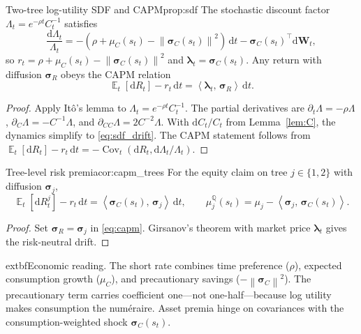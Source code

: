 ﻿\documentclass[11pt,letterpaper,oneside]{article}
\numberwithin{equation}{section}
\DeclareMathOperator{\E}{\mathbb{E}}
\DeclareMathOperator{\Cov}{\mathrm{Cov}}
\newcommand{\1}{\mathbf{1}}
\newcommand{\diff}{\mathrm{d}}
\newcommand{\norm}[1]{\left\lVert #1\right\rVert}
\newcommand{\ip}[2]{\left\langle #1,\,#2\right\rangle}
\begin{document}
\begin{proposition}{Two-tree log-utility SDF and CAPM}{prop:sdf}
The stochastic discount factor $\Lambda_t=e^{-\rho t}C_t^{-1}$ satisfies
\begin{equation}\label{eq:sdf_drift}
  \frac{\diff \Lambda_t}{\Lambda_t}=-(\rho+\mu_C(s_t)-\norm{\bm{\sigma}_C(s_t)}^2)\,\diff t-\bm{\sigma}_C(s_t)^{\top}\diff \bm{W}_t,
\end{equation}
so $r_t=\rho+\mu_C(s_t)-\norm{\bm{\sigma}_C(s_t)}^2$ and $\bm{\lambda}_t=\bm{\sigma}_C(s_t)$. Any return with diffusion $\bm{\sigma}_R$ obeys the CAPM relation
\begin{equation}\label{eq:capm}
  \E_t[\diff R_t]-r_t\,\diff t=\ip{\bm{\lambda}_t}{\bm{\sigma}_R}\,\diff t.
\end{equation}
\end{proposition}
\begin{proof}
Apply It\^o's lemma to $\Lambda_t = e^{-\rho t} C_t^{-1}$. The partial derivatives are $\partial_t\Lambda=-\rho\Lambda$, $\partial_C\Lambda=-C^{-1}\Lambda$, and $\partial_{CC}\Lambda=2C^{-2}\Lambda$. With $\diff C_t/C_t$ from Lemma~\ref{lem:C}, the dynamics simplify to \eqref{eq:sdf_drift}. The CAPM statement follows from $\E_t[\diff R_t]-r_t\,\diff t=-\Cov_t(\diff R_t,\diff\Lambda_t/\Lambda_t)$.
\end{proof}

\begin{corollary}{Tree-level risk premia}{cor:capm_trees}
For the equity claim on tree $j\in\{1,2\}$ with diffusion $\bm{\sigma}_j$,
\begin{equation}\label{eq:tree_capm}
  \E_t[\diff R^j_t]-r_t\,\diff t=\ip{\bm{\sigma}_C(s_t)}{\bm{\sigma}_j}\,\diff t,
  \qquad
  \mu_j^{\mathbb{Q}}(s_t)=\mu_j-\ip{\bm{\sigma}_j}{\bm{\sigma}_C(s_t)}.
\end{equation}
\end{corollary}
\begin{proof}
Set $\bm{\sigma}_R=\bm{\sigma}_j$ in \eqref{eq:capm}. Girsanov's theorem with market price $\bm{\lambda}_t$ gives the risk-neutral drift.
\end{proof}

\begin{tcolorbox}[didacticstyle]
  extbf{Economic reading.} The short rate combines time preference ($\rho$), expected consumption growth ($\mu_C$), and precautionary savings ($-\norm{\bm{\sigma}_C}^2$). The precautionary term carries coefficient one---not one-half---because log utility makes consumption the num\'eraire. Asset premia hinge on covariances with the consumption-weighted shock $\bm{\sigma}_C(s_t)$.
\end{tcolorbox}
\end{document}
